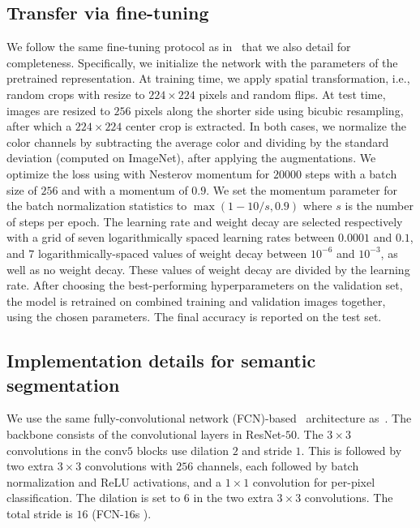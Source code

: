 \subsection{Transfer via fine-tuning}
We follow the same fine-tuning protocol as in~\cite{CPCv2,kolesnikov2019revisiting,dmlab,SimCLR} that we also detail for completeness. Specifically, we initialize the network with the parameters of the pretrained representation. At training time, we apply spatial transformation, i.e., random crops with resize to $224 \times 224$ pixels and random flips. At test time, images are resized to $256$ pixels along the shorter side using bicubic resampling, after which a $224 \times 224$ center crop is extracted. In both cases, we normalize the color channels by subtracting the average color and dividing by the standard deviation (computed on ImageNet), after applying the augmentations.
We optimize the loss using \SGD with Nesterov momentum for $20 000$ steps with a batch size of $256$ and with a momentum of $0.9$. We set the momentum parameter for the batch normalization statistics to $\max(1- 10 / s, 0.9)$ where $s$ is the number of steps per epoch. The learning rate and weight decay are selected respectively with a grid of seven logarithmically spaced learning rates between $0.0001$ and $0.1$, and $7$ logarithmically-spaced values of weight decay between $10^{-6}$ and $10^{-3}$, as well as no weight decay. These values of weight decay are divided by the learning rate. After choosing the best-performing hyperparameters on the validation set, the model is retrained on combined training and validation images together, using the chosen parameters. The final accuracy is reported on the test set.

\subsection{Implementation details for semantic segmentation}
\label{app:semantic_seg}
We use the same fully-convolutional network (FCN)-based~\cite{long2015fully} architecture as~\cite{MOCO}. The backbone consists of the convolutional layers in ResNet-$50$. The $3\times 3$ convolutions in the conv$5$ blocks use dilation $2$ and stride $1$. This is followed by two extra $3\times 3$ convolutions with $256$ channels, each followed by batch normalization and ReLU activations, and a $1\times 1$ convolution for per-pixel classification. The dilation is set to $6$ in the two extra $3\times 3$ convolutions. The total stride is $16$ (FCN-$16$s \cite{long2015fully}).

